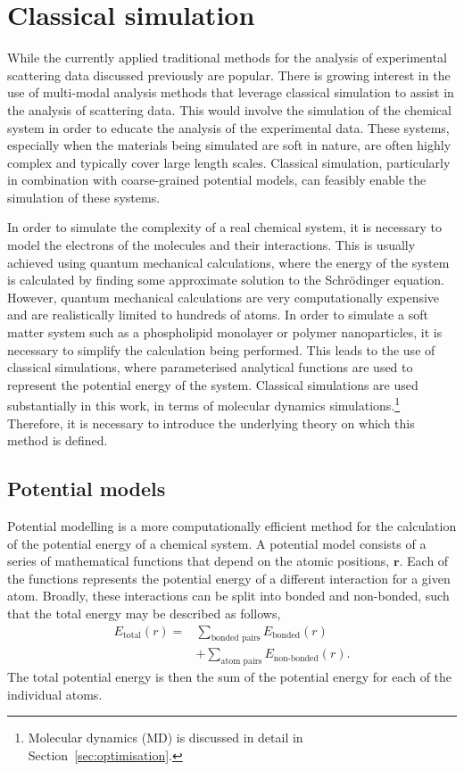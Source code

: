 \section{Classical simulation}
\label{sec:classical}
While the currently applied traditional methods for the analysis of experimental scattering data discussed previously are popular.
There is growing interest in the use of multi-modal analysis methods that leverage classical simulation to assist in the analysis of scattering data.
This would involve the simulation of the chemical system in order to educate the analysis of the experimental data.
These systems, especially when the materials being simulated are soft in nature, are often highly complex and typically cover large length scales.
Classical simulation, particularly in combination with coarse-grained potential models, can feasibly enable the simulation of these systems.

In order to simulate the complexity of a real chemical system, it is necessary to model the electrons of the molecules and their interactions.
This is usually achieved using quantum mechanical calculations, where the energy of the system is calculated by finding some approximate solution to the Schr\"{o}dinger equation.
However, quantum mechanical calculations are very computationally expensive and are realistically limited to hundreds of atoms.
In order to simulate a soft matter system such as a phospholipid monolayer or polymer nanoparticles, it is necessary to simplify the calculation being performed.
This leads to the use of classical simulations, where parameterised analytical functions are used to represent the potential energy of the system.
Classical simulations are used substantially in this work, in terms of molecular dynamics simulations.\footnote{Molecular dynamics (MD) is discussed in detail in Section~\ref{sec:optimisation}.}
Therefore, it is necessary to introduce the underlying theory on which this method is defined.

\subsection{Potential models}
\label{sec:potentmodels}
Potential modelling is a more computationally efficient method for the calculation of the potential energy of a chemical system.
A potential model consists of a series of mathematical functions that depend on the atomic positions, $\mathbf{r}$.
Each of the functions represents the potential energy of a different interaction for a given atom.
Broadly, these interactions can be split into bonded and non-bonded, such that the total energy may be described as follows,
%
\begin{equation}
\begin{aligned}
  E_{\text{total}}(r) = & \sum_{\text{bonded pairs}}{E_{\text{bonded}}(r)} \\
  & + \sum_{\text{atom pairs}}{E_{\text{non-bonded}}(r)}.
\end{aligned}
\end{equation}
%
The total potential energy is then the sum of the potential energy for each of the individual atoms.

